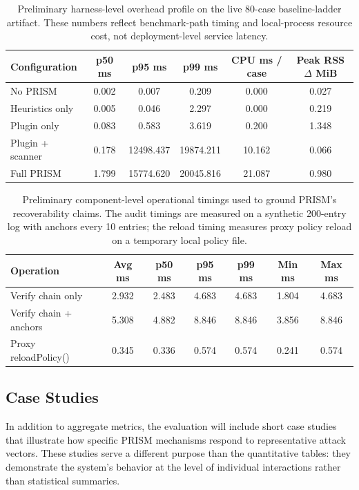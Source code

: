 \begin{table}[t]
\centering
\footnotesize
\begin{tabularx}{\textwidth}{l c c c c c}
\toprule
Configuration & p50 ms & p95 ms & p99 ms & CPU ms / case & Peak RSS $\Delta$ MiB \\
\midrule
No PRISM & 0.002 & 0.007 & 0.209 & 0.000 & 0.027 \\
Heuristics only & 0.005 & 0.046 & 2.297 & 0.000 & 0.219 \\
Plugin only & 0.083 & 0.583 & 3.619 & 0.200 & 1.348 \\
Plugin + scanner & 0.178 & 12498.437 & 19874.211 & 10.162 & 0.066 \\
Full PRISM & 1.799 & 15774.620 & 20045.816 & 21.087 & 0.980 \\
\bottomrule
\end{tabularx}
\caption{Preliminary harness-level overhead profile on the live 80-case baseline-ladder artifact. These numbers reflect benchmark-path timing and local-process resource cost, not deployment-level service latency.}
\label{tab:prelim-overhead}
\end{table}

\begin{table}[t]
\centering
\footnotesize
\begin{tabularx}{\textwidth}{l c c c c c c}
\toprule
Operation & Avg ms & p50 ms & p95 ms & p99 ms & Min ms & Max ms \\
\midrule
Verify chain only & 2.932 & 2.483 & 4.683 & 4.683 & 1.804 & 4.683 \\
Verify chain + anchors & 5.308 & 4.882 & 8.846 & 8.846 & 3.856 & 8.846 \\
Proxy reloadPolicy() & 0.345 & 0.336 & 0.574 & 0.574 & 0.241 & 0.574 \\
\bottomrule
\end{tabularx}
\caption{Preliminary component-level operational timings used to ground PRISM's recoverability claims. The audit timings are measured on a synthetic 200-entry log with anchors every 10 entries; the reload timing measures proxy policy reload on a temporary local policy file.}
\label{tab:prelim-operational}
\end{table}

\subsection{Case Studies}

In addition to aggregate metrics, the evaluation will include short case studies that illustrate how specific PRISM mechanisms respond to representative attack vectors. These studies serve a different purpose than the quantitative tables: they demonstrate the system's behavior at the level of individual interactions rather than statistical summaries.

